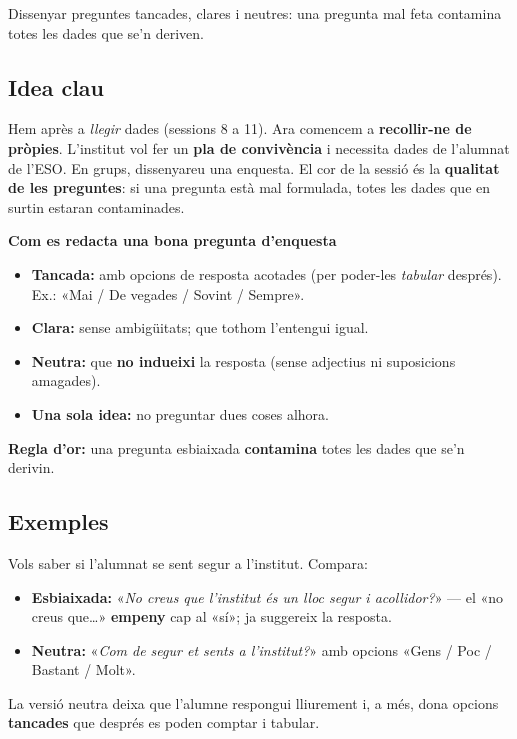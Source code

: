 %
{Dissenyar preguntes tancades, clares i neutres: una pregunta mal feta contamina totes les dades que se'n deriven.}

\subsection{Idea clau}

Hem après a \emph{llegir} dades (sessions 8 a 11). Ara comencem a \textbf{recollir-ne
de pròpies}. L'institut vol fer un \textbf{pla de convivència} i necessita dades de
l'alumnat de l'ESO. En grups, dissenyareu una enquesta. El cor de la sessió és la
\textbf{qualitat de les preguntes}: si una pregunta està mal formulada, totes les
dades que en surtin estaran contaminades.

\begin{idea}
\textbf{Com es redacta una bona pregunta d'enquesta}
\begin{itemize}[leftmargin=1.4em, itemsep=2pt]
  \item \textbf{Tancada:} amb opcions de resposta acotades (per poder-les
        \emph{tabular} després). Ex.: «Mai / De vegades / Sovint / Sempre».
  \item \textbf{Clara:} sense ambigüitats; que tothom l'entengui igual.
  \item \textbf{Neutra:} que \textbf{no indueixi} la resposta (sense adjectius ni
        suposicions amagades).
  \item \textbf{Una sola idea:} no preguntar dues coses alhora.
\end{itemize}
\textbf{Regla d'or:} una pregunta esbiaixada \textbf{contamina} totes les dades que
se'n derivin.
\end{idea}

\subsection{Exemples}

\begin{exemple}
Vols saber si l'alumnat se sent segur a l'institut. Compara:
\begin{itemize}[leftmargin=1.4em, itemsep=2pt]
  \item \textbf{Esbiaixada:} «\emph{No creus que l'institut és un lloc segur i
        acollidor?}» — el «no creus que\dots» \textbf{empeny} cap al «sí»; ja suggereix
        la resposta.
  \item \textbf{Neutra:} «\emph{Com de segur et sents a l'institut?}» amb opcions
        «Gens / Poc / Bastant / Molt».
\end{itemize}
La versió neutra deixa que l'alumne respongui lliurement i, a més, dona opcions
\textbf{tancades} que després es poden comptar i tabular.
\end{exemple}

